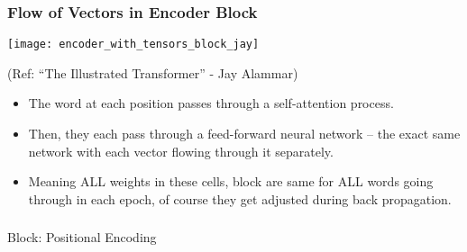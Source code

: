\begin{frame}[fragile]\frametitle{Flow of Vectors in Encoder Block}


\begin{center}
\texttt{[image: encoder\_with\_tensors\_block\_jay]}


{\tiny (Ref: ``The Illustrated Transformer'' - Jay Alammar)}
\end{center}		


\begin{itemize}
\item The word at each position passes through a self-attention process. 
\item Then, they each pass through a feed-forward neural network -- the exact same network with each vector flowing through it separately.
\item Meaning ALL weights in these cells, block are same for ALL words going through in each epoch, of course they get adjusted during back propagation.
\end{itemize}

\end{frame}


\begin{frame}[fragile]\frametitle{}
\begin{center}
{\Large Block: Positional Encoding}
\end{center}
\end{frame}

